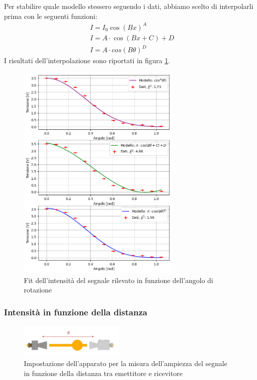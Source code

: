 \documentclass[letterpaper,12pt]{article}
\begin{document}
Per stabilire quale modello stessero seguendo i dati, abbiamo scelto di interpolarli prima con le seguenti funzioni:
\begin{align*}
    & I = I_0\cos(Bx)^A \\
    & I = A\cdot\cos(Bx + C) + D \\
    & I = A\cdot cos(B\theta)^D
\end{align*} 
I risultati dell'interpolazione sono riportati in figura \ref{fig:fit_rotazione}.

\begin{figure}[h!]
    \centering
    \includegraphics[width = 0.7\textwidth]{fit_rotazione.png}
    \caption{Fit dell'intensità del segnale rilevato in funzione dell'angolo di rotazione}
    \label{fig:fit_rotazione}
\end{figure}


\subsubsection{Intensità in funzione della distanza}

\begin{figure}[h!]
    \centering
    \includegraphics[width = 0.45\textwidth]{ampiezza distanza.jpg}
    \caption{Impostazione dell'apparato per la misura dell'ampiezza del segnale in funzione della distanza tra emettitore e ricevitore}
    \label{fig:ampiezza_distanza}
\end{figure}
\end{document}
